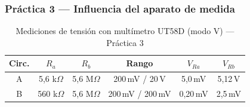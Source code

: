 \subsubsection{Práctica 3 --- Influencia del aparato de medida}
 
\begin{table}[H]
    \centering
    \caption{Mediciones de tensión con multímetro UT58D (modo V) --- Práctica 3}
    \label{tab:hoja-p3}
    \begin{tabular}{|c|c|c|c|c|c|}
        \hline
        \textbf{Circ.} & $R_a$ & $R_b$
            & \textbf{Rango} & $V_{Ra}$ & $V_{Rb}$ \\ \hline
        A & 5{,}6 k$\Omega$ & 5{,}6 M$\Omega$
            & 200\,mV / 20\,V & 5{,}0\,mV & 5{,}12\,V \\ \hline
        B & 560 k$\Omega$ & 5{,}6 M$\Omega$
            & 200\,mV / 200\,mV & 0{,}20\,mV & 2{,}5\,mV \\ \hline
    \end{tabular}
\end{table}